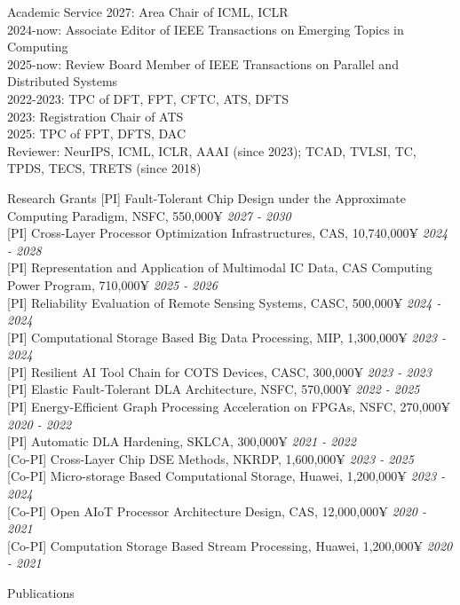 \documentclass{resume}
\begin{document}
\begin{rSection}{Academic Service}
{2027: Area Chair of ICML, ICLR} \\
{2024-now: Associate Editor of IEEE Transactions on Emerging Topics in Computing} \\
{2025-now: Review Board Member of IEEE Transactions on Parallel and Distributed Systems} \\
{2022-2023: TPC of DFT, FPT, CFTC, ATS, DFTS} \\
{2023: Registration Chair of ATS} \\
{2025: TPC of FPT, DFTS, DAC} \\
{Reviewer: NeurIPS, ICML, ICLR, AAAI (since 2023); TCAD, TVLSI, TC, TPDS, TECS, TRETS (since 2018)} \\
\vspace{-1em}
\end{rSection}

\begin{rSection}{Research Grants}
{[PI] Fault-Tolerant Chip Design under the Approximate Computing Paradigm, NSFC, 550,000¥} \hfill {\em 2027 - 2030} \\
{[PI] Cross-Layer Processor Optimization Infrastructures, CAS, 10,740,000¥} \hfill {\em 2024 - 2028} \\
{[PI] Representation and Application of Multimodal IC Data, CAS Computing Power Program, 710,000¥} \hfill {\em 2025 - 2026} \\
{[PI] Reliability Evaluation of Remote Sensing Systems, CASC, 500,000¥} \hfill {\em 2024 - 2024} \\
{[PI] Computational Storage Based Big Data Processing, MIP, 1,300,000¥} \hfill {\em 2023 - 2024} \\
{[PI] Resilient AI Tool Chain for COTS Devices, CASC, 300,000¥} \hfill {\em 2023 - 2023} \\
{[PI] Elastic Fault-Tolerant DLA Architecture, NSFC, 570,000¥} \hfill {\em 2022 - 2025} \\
{[PI] Energy-Efficient Graph Processing Acceleration on FPGAs, NSFC, 270,000¥} \hfill {\em 2020 - 2022} \\
{[PI] Automatic DLA Hardening, SKLCA, 300,000¥} \hfill {\em 2021 - 2022} \\
{[Co-PI] Cross-Layer Chip DSE Methods, NKRDP, 1,600,000¥} \hfill {\em 2023 - 2025} \\
{[Co-PI] Micro-storage Based Computational Storage, Huawei, 1,200,000¥} \hfill {\em 2023 - 2024} \\
{[Co-PI] Open AIoT Processor Architecture Design, CAS, 12,000,000¥} \hfill {\em 2020 - 2021} \\
{[Co-PI] Computation Storage Based Stream Processing, Huawei, 1,200,000¥} \hfill {\em 2020 - 2021} \\
\end{rSection}

\begin{rSection}{Publications}
\end{rSection}
\nocite{*}
\printbibliography
\end{document}

